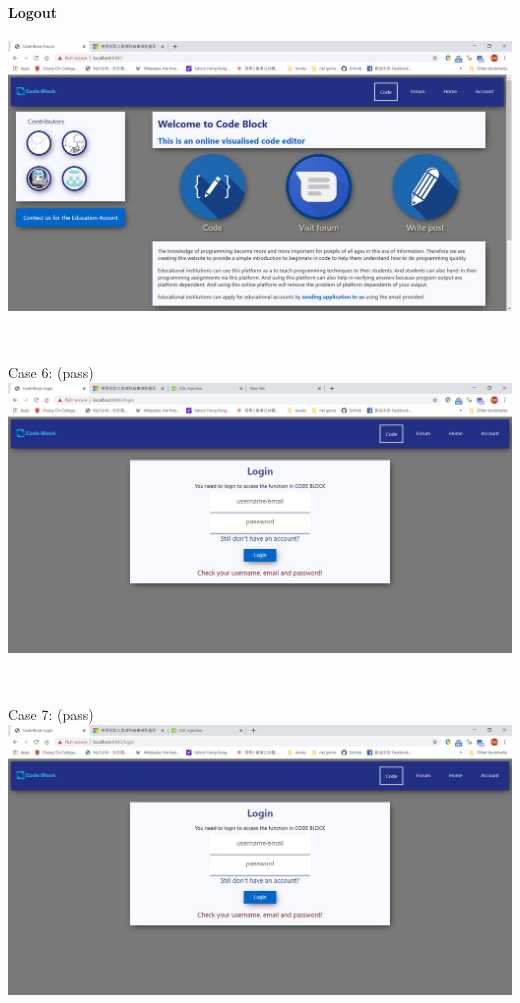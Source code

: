 \paragraph{Logout}

\includegraphics[scale=0.45]{Doc/Pics/logout}

~

Case 6: (pass)\\
\includegraphics[scale=0.45]{Doc/Pics/case-5-2-6}

~

Case 7: (pass)\\
\includegraphics[scale=0.45]{Doc/Pics/case-5-2-7}

